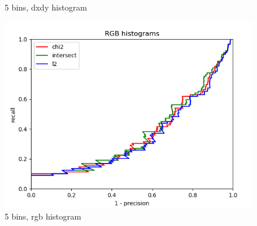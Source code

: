 \documentclass{article}
\begin{document}
\begin{figure}[ht]
\begin{minipage}{.5\textwidth}
        \caption{5 bins, dxdy histogram}
    \end{minipage}
    \begin{minipage}{.5\textwidth}
        \includegraphics[width=\linewidth]{images/Q4.b-rgb_histogram_5_bins.png}
        \caption{5 bins, rgb histogram}
    \end{minipage}
\end{figure}
\end{document}
